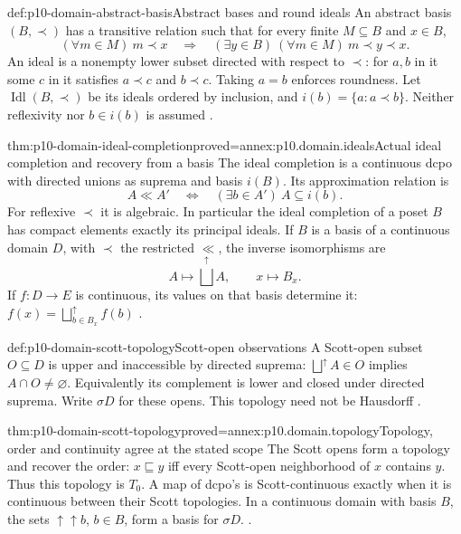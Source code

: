 \begin{hbdefinition}{def:p10-domain-abstract-basis}{Abstract bases and round ideals}
An abstract basis \((B,\prec)\) has a transitive relation such that
for every finite \(M\subseteq B\) and \(x\in B\),
\[
  (\forall m\in M)\ m\prec x
       \quad\Longrightarrow\quad
  (\exists y\in B)\ (\forall m\in M)\ m\prec y\prec x.
\]
An ideal is a nonempty lower subset directed with respect to \(\prec\):
for \(a,b\) in it some \(c\) in it satisfies \(a\prec c\) and
\(b\prec c\). Taking \(a=b\) enforces roundness. Let
\(\operatorname{Idl}(B,\prec)\) be its ideals ordered by inclusion,
and \(i(b)=\{a:a\prec b\}\). Neither reflexivity nor
\(b\in i(b)\) is assumed
\cite[Definitions~2.2.20--21, pp.~26--27]
{AbramskyJungCorrectedExpandedDomainTheory}.
\end{hbdefinition}

\begin{hbtheorem}{thm:p10-domain-ideal-completion}{proved=annex:p10.domain.ideals}{Actual ideal completion and recovery from a basis}
The ideal completion is a continuous dcpo with directed unions as
suprema and basis \(i(B)\). Its approximation relation is
\[
 A\ll A'\quad\Longleftrightarrow\quad
       (\exists b\in A')\ A\subseteq i(b).
\]
For reflexive \(\prec\) it is algebraic. In particular the ideal
completion of a poset \(B\) has compact elements exactly its
principal ideals. If \(B\) is a basis of a continuous domain \(D\),
with \(\prec\) the restricted \(\ll\), the inverse isomorphisms are
\[
 A\longmapsto\bigsqcup^{\uparrow}A,
       \qquad x\longmapsto B_x.
\]
If \(f:D\to E\) is continuous, its values on that basis determine it:
\(f(x)=\bigsqcup^{\uparrow}_{b\in B_x}f(b)\)
\cite[Propositions~2.2.22,2.2.25; Corollary~2.2.26, pp.~27--28]
{AbramskyJungCorrectedExpandedDomainTheory}.
\end{hbtheorem}

\begin{hbdefinition}{def:p10-domain-scott-topology}{Scott-open observations}
A Scott-open subset \(O\subseteq D\) is upper and inaccessible by
directed suprema: \(\bigsqcup^{\uparrow}A\in O\) implies
\(A\cap O\ne\varnothing\). Equivalently its complement is lower
and closed under directed suprema. Write \(\sigma D\) for these
opens. This topology need not be Hausdorff
\cite[Definition~2.3.1, p.~29]{AbramskyJungCorrectedExpandedDomainTheory}.
\end{hbdefinition}

\begin{hbtheorem}{thm:p10-domain-scott-topology}{proved=annex:p10.domain.topology}{Topology, order and continuity agree at the stated scope}
The Scott opens form a topology and recover the order:
\(x\sqsubseteq y\) iff every Scott-open neighborhood of \(x\)
contains \(y\). Thus this topology is \(T_0\).
A map of dcpo's is Scott-continuous exactly when it is continuous
between their Scott topologies. In a continuous domain with basis
\(B\), the sets \(\mathord{\uparrow\!\uparrow}b\), \(b\in B\),
form a basis for \(\sigma D\).
\cite[Propositions~2.3.2,2.3.4--6, pp.~29--31]
{AbramskyJungCorrectedExpandedDomainTheory}.
\end{hbtheorem}

